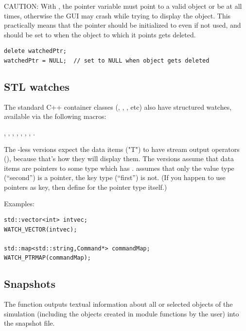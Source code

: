 CAUTION: With , the pointer variable must point to a valid
object or be  at all times, otherwise the GUI may crash
while trying to display the object. This practically means that
the pointer should be initialized to  even if not used, and
should be set to  when the object to which it points gets deleted.

\begin{verbatim}
delete watchedPtr;
watchedPtr = NULL;  // set to NULL when object gets deleted
\end{verbatim}


\subsection{STL watches}

The standard C++ container classes (, , , etc)
also have structured watches, available via the following macros:

, ,
, ,
, ,
, .

The -less versions expect the data items ("T") to have
stream output operators (), because that's how
they will display them. The  versions assume that
data items are pointers to some type which has .
 assumes that only the value type (``second'')
is a pointer, the key type (``first'') is not. (If you happen to use
pointers as key, then define  for the pointer type
itself.)

Examples:

\begin{verbatim}
std::vector<int> intvec;
WATCH_VECTOR(intvec);

std::map<std::string,Command*> commandMap;
WATCH_PTRMAP(commandMap);
\end{verbatim}



\subsection{Snapshots}
\label{sec:ch-sim-lib:snapshots}

The  function outputs textual information about all
or selected objects of the simulation (including the objects created
in module functions by the user) into the snapshot file.

